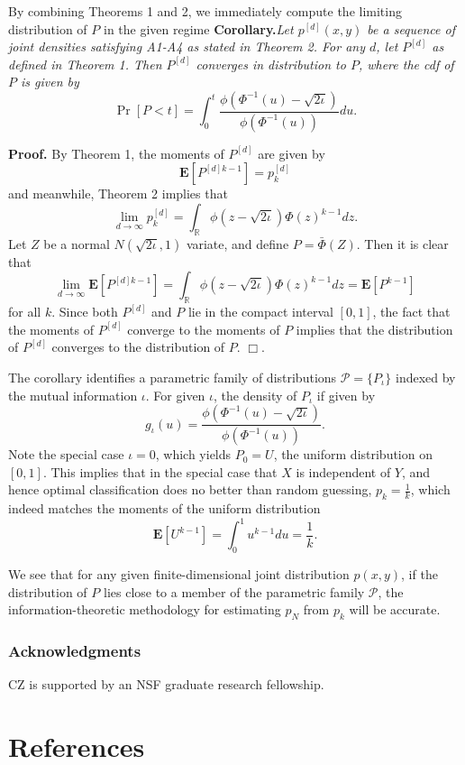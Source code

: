 \documentclass{article}
\newcommand{\E}{\textbf{E}}
\begin{document}
By combining Theorems 1 and 2, we immediately compute the limiting distribution of $P$
in the given regime
\noindent\textbf{Corollary.}\emph{Let $p^{[d]}(x, y)$ be a sequence of joint densities satisfying A1-A4 as stated in
Theorem 2.
For any $d$, let $P^{[d]}$ as defined in Theorem 1.
Then $P^{[d]}$ converges in distribution to $P$, where the cdf of $P$ is given by
\[
\Pr[P < t] = \int_0^t \frac{\phi(\Phi^{-1}(u) - \sqrt{2\iota})}{\phi(\Phi^{-1}(u))} du.
\]
}

\noindent\textbf{Proof.} By Theorem 1, the moments of $P^{[d]}$ are given by
\[
\E[P^{[d]k-1}] = p_k^{[d]}
\]
and meanwhile, Theorem 2 implies that
\[
\lim_{d \to \infty} p_k^{[d]} = \int_{\mathbb{R}} \phi(z - \sqrt{2\iota}) \Phi(z)^{k-1} dz.
\]
Let $Z$ be a normal $N(\sqrt{2\iota}, 1)$ variate,
and define $P = \bar{\Phi}(Z)$.
Then it is clear that
\[
\lim_{d \to \infty} \E[P^{[d]k-1}] = \int_{\mathbb{R}} \phi(z - \sqrt{2\iota}) \Phi(z)^{k-1} dz = \E[P^{k-1}]
\]
for all $k$.  Since both $P^{[d]}$ and $P$ lie in the compact interval
$[0, 1]$, the fact that the moments of $P^{[d]}$ converge to the
moments of $P$ implies that the distribution of $P^[d]$ converges to
the distribution of $P$. $\Box$.

The corollary identifies a parametric family of distributions
$\mathcal{P} = \{P_\iota\}$ indexed by the mutual information $\iota$.
For given $\iota$, the density of $P_\iota$ if given by
\[
g_\iota(u) = \frac{\phi(\Phi^{-1}(u) - \sqrt{2\iota})}{\phi(\Phi^{-1}(u))}.
\]
Note the special case $\iota = 0$, which yields $P_0 = U$, the uniform
distribution on $[0,1]$.  This implies that in the special case that
$X$ is independent of $Y$, and hence optimal classification does no
better than random guessing, $p_k = \frac{1}{k}$, which indeed matches
the moments of the uniform distribution
\[
\E[U^{k-1}] = \int_0^1 u^{k-1} du = \frac{1}{k}.
\]

We see that for any given finite-dimensional joint distribution $p(x,
y)$, if the distribution of $P$ lies close to a member of the
parametric family $\mathcal{P}$, the information-theoretic methodology
for estimating $p_N$ from $p_k$ will be accurate.

\subsubsection*{Acknowledgments}

CZ is supported by an NSF graduate research fellowship.

\section*{References}
\end{document}
